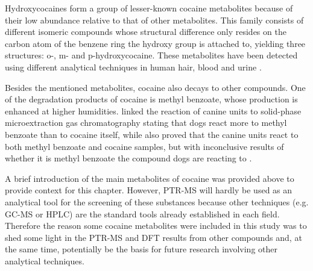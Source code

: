 

Hydroxycocaines form a group of lesser-known cocaine metabolites because of their low abundance relative to that of other metabolites.
%
This family consists of  different isomeric compounds whose structural difference only resides on the carbon atom of the benzene ring the hydroxy group is attached to, yielding three structures: o-, m- and p-hydroxycocaine. 
%
These metabolites have been detected using different analytical techniques  in human hair,  blood and urine   \cite{schaffer2016analysis,paul2005concentration,robandt2008complete,klette2000simultaneous,cone1991testing}.
%





Besides the mentioned metabolites, cocaine also decays to  other  compounds.
%
One of the  degradation products of cocaine is methyl benzoate, whose production is enhanced at higher humidities.
%
\citeauthor{furton2002identification} linked the reaction of canine  units to solid-phase microextraction gas chromatography  stating that dogs react more to methyl benzoate  than to cocaine itself, while \citeauthor{waggoner1997canine} also proved that the canine units react to both methyl benzoate and cocaine samples, but with inconclusive results of whether it is methyl benzoate the compound dogs are reacting to
\cite{furton2002identification,waggoner1997canine}.



A brief introduction of the main metabolites of cocaine was provided above to provide context for this chapter.
%
However, PTR-MS will hardly be used as an analytical tool for the screening of these substances because other techniques (e.g. GC-MS or HPLC) are the standard tools already established  in each field.
%
Therefore the reason some  cocaine metabolites were included in this study was to shed some light in the PTR-MS and DFT results from other compounds and, at the same time, potentially be the basis for future research involving other analytical techniques.












